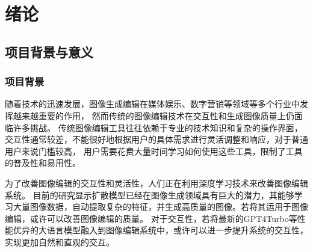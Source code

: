 \documentclass[a4paper,AutoFakeBold,oneside,12pt]{book}
\begin{document}

\blankmatter
  

\blankmatter
 

\blankmatter
  




\frontmatter
\tableofcontents %

\newpage\mainmatter
{}



\chapter{绪论} %
\section{项目背景与意义}
\subsection{项目背景}
随着技术的迅速发展，图像生成编辑在媒体娱乐、数字营销等领域等多个行业中发挥越来越重要的作用，
然而传统的图像编辑技术在交互性和生成图像质量上仍面临许多挑战。
传统图像编辑工具往往依赖于专业的技术知识和复杂的操作界面，交互性通常较差，不能很好地根据用户的具体需求进行灵活调整和响应，对于普通用户来说门槛较高，
用户需要花费大量时间学习如何使用这些工具，限制了工具的普及性和易用性。

为了改善图像编辑的交互性和灵活性，人们正在利用深度学习技术来改善图像编辑系统。
目前的研究显示扩散模型已经在图像生成领域具有巨大的潜力，其能够学习大量图像数据，自动提取复杂的特征，并生成高质量的图像。若将其运用于图像编辑，或许可以改善图像编辑的质量。
对于交互性，若将最新的GPT4Turbo等性能优异的大语言模型融入到图像编辑系统中，或许可以进一步提升系统的交互性，实现更加自然和直观的交互。
\end{document}
